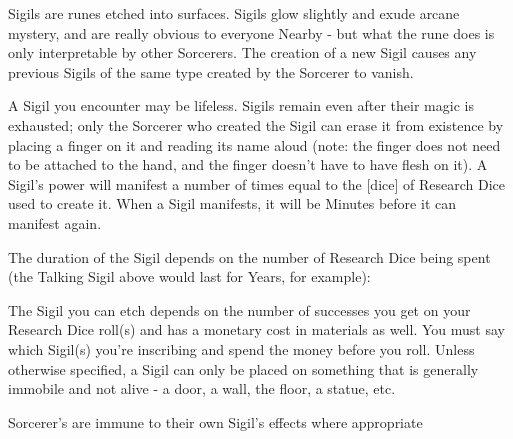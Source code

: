 {

Sigils are runes etched into surfaces.  Sigils glow slightly and exude arcane mystery, and are really obvious to everyone Nearby - but what the rune does is only interpretable by other Sorcerers.  The creation of a new Sigil causes any previous Sigils of the same type created by the Sorcerer to vanish.

A Sigil you encounter may be lifeless.  Sigils remain even after their magic is exhausted; only the Sorcerer who created the Sigil can erase it from existence by placing a finger on it and reading its name aloud (note: the finger does not need to be attached to the hand, and the finger doesn't have to have flesh on it).  A Sigil's power will manifest a number of times equal to the [dice] of Research Dice used to create it.  When a Sigil manifests, it will be Minutes before it can manifest again.


The duration of the Sigil depends on the number of Research Dice being spent (the Talking Sigil above would last for Years, for example):


The Sigil you can etch depends on the number of successes you get on your Research Dice roll(s) and has a monetary cost in materials as well.  You must say which Sigil(s) you're inscribing and spend the money before you roll.  Unless otherwise specified, a Sigil can only be placed on something that is generally immobile and not alive - a door, a wall, the floor, a statue, etc.  

Sorcerer's are immune to their own Sigil's effects where appropriate




}

